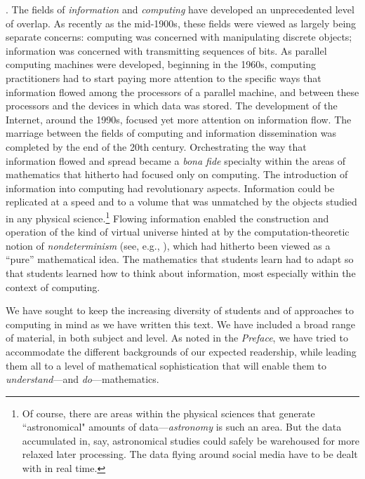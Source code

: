  
.
The fields of {\it information} and {\em computing} have developed an unprecedented level of overlap.  As recently as the mid-1900s, these fields were viewed as largely being separate concerns: computing was concerned with manipulating discrete objects; information was concerned with transmitting sequences of bits.  As parallel computing machines were developed, beginning in the 1960s, computing practitioners had to start paying more attention to the specific ways that information flowed among the processors of a parallel machine, and between these processors and the devices in which data was stored.  The development of the Internet, around the 1990s, focused yet more attention on information flow.  The marriage between the fields of computing and information dissemination was completed by the end of the 20th century.  Orchestrating the way that information flowed and spread became a {\it bona fide} specialty within the areas of mathematics that hitherto had focused only on computing.  The introduction of information into computing had revolutionary aspects.  Information could be replicated at a speed and to a volume that was unmatched by the objects studied in any physical science.\footnote{Of course, there are areas within the  physical sciences that generate ``astronomical" amounts of data---{\it astronomy} is such an area.  But the data accumulated in, say, astronomical studies could safely be warehoused for more relaxed later processing.  The data flying around social media have to be dealt with in real time.}  Flowing information enabled the construction and operation of the kind of virtual universe hinted at by the computation-theoretic notion of {\it nondeterminism}  (see, e.g., \cite{Rosenberg09}), which had hitherto been viewed as a ``pure'' mathematical idea.  The mathematics that students learn had to adapt so that students learned how to think about information, most especially within the context of computing.

\bigskip

We have sought to keep the increasing diversity of students and of approaches to computing in mind as we have written this text.  We have included a broad range of material, in both subject and level.  As noted in the {\it Preface}, we have tried to accommodate the different backgrounds of our expected readership, while leading them all to a level of mathematical sophistication that will enable them to {\em understand}---and {\em do}---mathematics.

